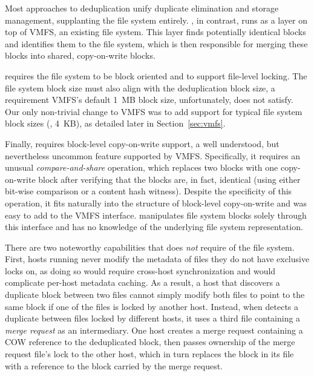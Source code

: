 Most approaches to deduplication unify duplicate elimination and
storage management, supplanting the file system entirely.  \DeDe, in
contrast, runs as a layer on top of VMFS, an existing file system.
This layer finds potentially identical blocks and identifies them to
the file system, which is then responsible for merging these blocks
into shared, copy-on-write blocks.

\DeDe requires the file system to be block oriented and to support
file-level locking.  The file
system block size must also align with the deduplication block size, a
requirement VMFS's default 1~MB block size, unfortunately, does not
satisfy.  Our only non-trivial change to VMFS was to add support for
typical file system block sizes (\ie, 4~KB), as detailed later in
Section~\ref{sec:vmfs}.

Finally, \DeDe requires block-level copy-on-write support, a well
understood, but nevertheless uncommon feature supported by VMFS.
Specifically, it requires an unusual \emph{compare-and-share} operation,
which replaces two blocks with one copy-on-write block after verifying
that the blocks are, in fact, identical (using either bit-wise
comparison or a content hash witness).  Despite the specificity of
this operation, it fits naturally into the structure of block-level
copy-on-write and was easy to add to the VMFS interface.  \DeDe
manipulates file system blocks solely through this interface and has
no knowledge of the underlying file system representation.

There are two noteworthy capabilities that \DeDe does \emph{not}
require of the file system.  First, hosts running \DeDe never modify
the metadata of files they do not have exclusive locks on, as doing so
would require cross-host synchronization and would complicate per-host
metadata caching.  As a result, a host that discovers a duplicate block
between two files cannot simply modify both files to point to the
same block if one of the files is locked by another host.  Instead,
when \DeDe detects a duplicate between files locked by different
hosts, it uses a third file containing a \emph{merge request} as an
intermediary.  One host creates a merge request containing a COW
reference to the deduplicated block, then passes ownership of the
merge request file's lock to the other host, which in turn replaces
the block in its file with a reference to the block carried by the
merge request.


